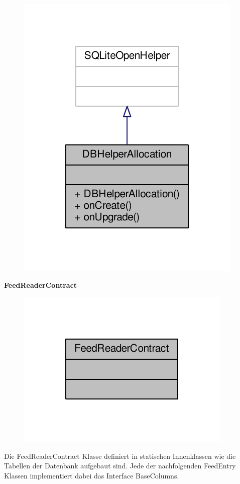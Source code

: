 \begin{figure}[H]
	\includegraphics[scale = 1]{res/umlClasses/d_b_helper_allocation__coll__graph.pdf}
	\centering
\end{figure}


\textbf{FeedReaderContract}
\begin{figure}[H]
	\includegraphics[scale = 1]{res/umlClasses/feed_reader_contract__coll__graph.pdf}
	\centering
\end{figure}
Die FeedReaderContract Klasse definiert in statischen Innenklassen wie die Tabellen der Datenbank aufgebaut sind. Jede der nachfolgenden FeedEntry Klassen implementiert dabei das Interface BaseColumns.

